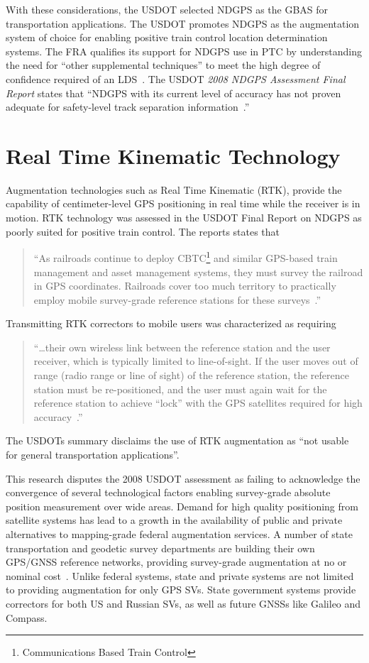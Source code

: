 With these considerations, the USDOT selected NDGPS as the GBAS for transportation applications. The USDOT promotes NDGPS as the augmentation system of choice for enabling positive train control location determination systems. The FRA qualifies its support for NDGPS use in PTC by understanding the need for ``other supplemental techniques'' to meet the high degree of confidence required of an LDS~\citep{1995FRADiffe}. The USDOT \emph{2008 NDGPS Assessment Final Report} states that ``NDGPS with its current level of accuracy has not proven adequate for safety-level track separation information~\citep{2008USDoT_NDGPS}.''

\section{Real Time Kinematic Technology}
Augmentation technologies such as Real Time Kinematic (RTK), provide the capability of centimeter-level GPS positioning in real time while the receiver is in motion. RTK technology was assessed in the USDOT Final Report on NDGPS as poorly suited for positive train control. The reports states that
\begin{quotation}``As railroads continue to deploy CBTC\footnote{Communications Based Train Control} and similar GPS-based train management and asset management systems, they must survey the railroad in GPS coordinates. Railroads cover too much territory to practically employ mobile survey-grade reference stations for these surveys~\citep[pp.12]{2008USDoT_NDGPS}.''\end{quotation}
Transmitting RTK correctors to mobile users was characterized as requiring
\begin{quotation}``\ldots their own wireless link between the reference station and the user receiver, which is typically limited to line-of-sight. If the user moves out of range (radio range or line of sight) of the reference station, the reference station must be re-positioned, and the user must again wait for the reference station to achieve ``lock'' with the GPS satellites required for high accuracy~\citep{2008USDoT_NDGPS}.''\end{quotation}
The USDOTs summary disclaims the use of RTK augmentation as ``not usable for general transportation applications''\citep[ES-7]{2008USDoT_NDGPS}.

This research disputes the 2008 USDOT assessment as failing to acknowledge the convergence of several technological factors enabling survey-grade absolute position measurement over wide areas. Demand for high quality positioning from satellite systems has lead to a growth in the availability of public and private alternatives to mapping-grade federal augmentation services. A number of state transportation and geodetic survey departments are building their own GPS/GNSS reference networks, providing survey-grade augmentation at no or nominal cost~\cite{ODOTvrs,MDOTvrs,NCvrs,KYCORS}. Unlike federal systems, state and private systems are not limited to providing augmentation for only GPS SVs. State government systems provide correctors for both US and Russian SVs, as well as future GNSSs like Galileo and Compass.


